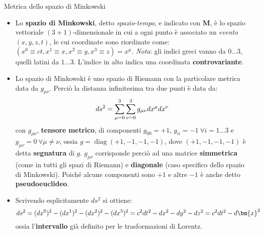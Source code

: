 \documentclass[a4_2,grid,frame]{flashcards}
\newenvironment{cartaflash}
    {\vspace{-15pt}
    \begin{itemize}
    }
    {
    \end{itemize}
    }
\begin{document}
\begin{flashcard}[Metrica]{Metrica dello spazio di Minkowski}
\begin{cartaflash}
\item Lo \textbf{spazio di Minkowski}, detto \textit{spazio-tempo}, e indicato con $\bm{M}$, è lo spazio vettoriale $(3+1)$-dimensionale in cui a ogni punto è associato un \textit{evento} $(x,y,z,t)$, le cui coordinate sono riordinate come: $(x^0 \equiv ct, x^1 \equiv x, x^2 \equiv y, x^3 \equiv z) = x^\mu$. \textit{Nota}: gli indici greci vanno da $0\dots3$, quelli latini da $1\dots 3$. L'indice in alto indica una coordinata \textbf{controvariante}. 
\vspace{-8pt}
\item Lo spazio di Minkowski è uno spazio di Riemann con la particolare metrica data da $g_{\mu\nu}$. Perciò la distanza infinitesima tra due punti è data da: 
\vspace{-8pt}\[
ds^2 = \sum_{\mu=0}^3 \sum_{\nu=0}^3 g_{\mu\nu} dx^\mu dx^\nu
\vspace{-8pt}
\]
con $g_{\mu\nu}$, \textbf{tensore metrico}, di componenti $g_{00} = +1$, $g_{ii} = -1\> \forall i = 1\dots 3$ e $g_{\mu\nu} = 0 \> \forall \mu \neq \nu$, ossia $g = \operatorname{diag}(+1,-1,-1,-1)$, dove $(+1,-1,-1,-1)$ è detta \textbf{segnatura} di $g$. $g_{\mu\nu}$ corrisponde perciò ad una matrice \textbf{simmetrica} (come in tutti gli spazi di Riemann) e \textbf{diagonale} (caso specifico dello spazio di Minkowski). Poiché alcune componenti sono $+1$ e altre $-1$ è anche detto \textbf{pseudoeuclideo}.
\vspace{-8pt}
\item Scrivendo esplicitamente $ds^2$ si ottiene:
\vspace{-8pt}
\[
ds^2 = (dx^0)^2 - (dx^1)^2 - (dx^2)^2 - (dx^3)^2 = c^2 dt^2-dx^2 -dy^2 -dz^2 = c^2dt^2 -d\bm{x}^2
\vspace{-8pt}
\]
ossia l'\textbf{intervallo} già definito per le trasformazioni di Lorentz.
\end{cartaflash}
\end{flashcard}
\end{document}

